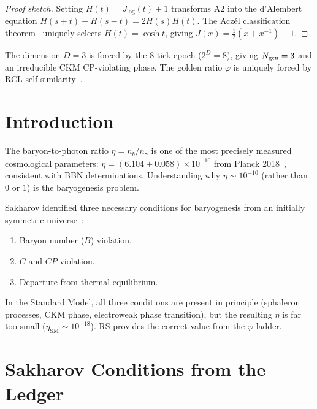 \documentclass[12pt,a4paper]{article}
\theoremstyle{definition}
\theoremstyle{remark}
\begin{document}
\begin{proof}[Proof sketch]
Setting $H(t)=J_{\log}(t)+1$ transforms A2 into the d'Alembert
equation $H(s+t)+H(s-t)=2H(s)H(t)$.  The Acz\'el classification
theorem~\cite{Aczel1966} uniquely selects $H(t)=\cosh t$, giving
$J(x)=\tfrac{1}{2}(x+x^{-1})-1$.
\end{proof}

\noindent The dimension $D=3$ is forced by the 8-tick epoch
($2^D=8$), giving $N_{\rm gen}=3$ and an irreducible CKM
CP-violating phase.  The golden ratio $\varphi$ is uniquely
forced by RCL self-similarity~\cite{RS_Axioms}.

\section{Introduction}
\label{sec:intro}

The baryon-to-photon ratio $\eta = n_b/n_\gamma$ is one of the
most precisely measured cosmological parameters:
$\eta = (6.104 \pm 0.058) \times 10^{-10}$ from Planck
2018~\cite{Planck2020}, consistent with BBN determinations.
Understanding why $\eta \sim 10^{-10}$ (rather than $0$ or $1$)
is the baryogenesis problem.

Sakharov identified three necessary conditions for baryogenesis
from an initially symmetric universe~\cite{Sakharov1967}:
\begin{enumerate}
  \item Baryon number ($B$) violation.
  \item $C$ and $CP$ violation.
  \item Departure from thermal equilibrium.
\end{enumerate}

In the Standard Model, all three conditions are present in
principle (sphaleron processes, CKM phase, electroweak phase
transition), but the resulting $\eta$ is far too small
($\eta_{\mathrm{SM}} \sim 10^{-18}$).  RS provides the correct
value from the $\varphi$-ladder.

\section{Sakharov Conditions from the Ledger}
\label{sec:sakharov}
\end{document}
